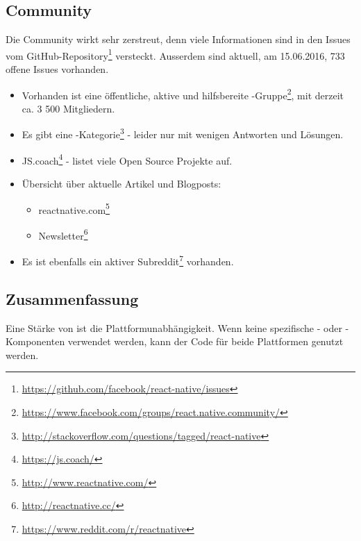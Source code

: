 \subsection{Community}
Die Community wirkt sehr zerstreut, denn viele Informationen sind in den Issues vom  GitHub-Repository\footnote{\url{https://github.com/facebook/react-native/issues}} versteckt.
Ausserdem sind aktuell, am 15.06.2016, 733 offene Issues vorhanden.

\begin{itemize}
	\item Vorhanden ist eine öffentliche, aktive und hilfsbereite -Gruppe\footnote{\url{https://www.facebook.com/groups/react.native.community/}}, mit derzeit ca. 3 500 Mitgliedern.
	\item Es gibt eine -Kategorie\footnote{\url{http://stackoverflow.com/questions/tagged/react-native}} - leider nur mit wenigen Antworten und Lösungen.
	\item JS.coach\footnote{\url{https://js.coach/}} - listet viele Open Source Projekte auf.
	\item Übersicht über aktuelle Artikel und Blogposts: 
	\begin{itemize}
		\item reactnative.com\footnote{\url{http://www.reactnative.com/}}
		\item {} Newsletter\footnote{\url{http://reactnative.cc/}}
	\end{itemize}
	\item Es ist ebenfalls ein aktiver Subreddit\footnote{\url{https://www.reddit.com/r/reactnative}} vorhanden.
\end{itemize}


\subsection{Zusammenfassung}
Eine Stärke von  ist die Plattformunabhängigkeit. 
Wenn keine spezifische - oder -Komponenten verwendet werden, kann der Code für beide Plattformen genutzt werden.

